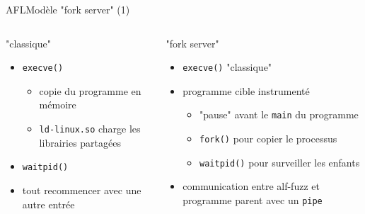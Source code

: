 \begin{frame}{AFL}{Modèle "fork server" (1)}
  \begin{columns}[t]
    \begin{column}{0.49\textwidth}
      \begin{block}{"classique"}
        \begin{itemize}
        \item \lstinline{execve()}
          \begin{itemize}
          \item copie du programme en mémoire
          \item \lstinline{ld-linux.so} charge les librairies partagées
          \end{itemize}
        \item \lstinline{waitpid()}
        \item tout recommencer avec une autre entrée
        \end{itemize}
        \vspace{3.5ex}
      \end{block}
    \end{column}

    \begin{column}{0.49\textwidth}
      \begin{block}{"fork server"}
        \begin{itemize}
        \item \lstinline{execve()} "classique"
        \item programme cible instrumenté
          \begin{itemize}
          \item "pause" avant le \lstinline{main} du programme
          \item \lstinline{fork()} pour copier le processus
          \item \lstinline{waitpid()} pour surveiller les enfants
          \end{itemize}
        \item communication entre alf-fuzz et programme parent avec un \lstinline{pipe}
        \end{itemize}
      \end{block}
    \end{column}
  \end{columns}
\end{frame}

